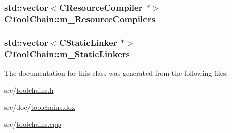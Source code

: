 \hypertarget{classCToolChain_a3e599d8c68f4a561cbbe8291ff1a3471}{
\subsubsection[{m\-\_\-\-Resource\-Compilers}]{\setlength{\rightskip}{0pt plus 5cm}std\-::vector$<${\bf C\-Resource\-Compiler} $\ast$$>$ C\-Tool\-Chain\-::m\-\_\-\-Resource\-Compilers\hspace{0.3cm}{\ttfamily [protected]}}}\label{classCToolChain_a3e599d8c68f4a561cbbe8291ff1a3471}
\hypertarget{classCToolChain_a1e20a20e78789bb05ee38b8da4ab6b3e}{
\subsubsection[{m\-\_\-\-Static\-Linkers}]{\setlength{\rightskip}{0pt plus 5cm}std\-::vector$<${\bf C\-Static\-Linker} $\ast$$>$ C\-Tool\-Chain\-::m\-\_\-\-Static\-Linkers\hspace{0.3cm}{\ttfamily [protected]}}}\label{classCToolChain_a1e20a20e78789bb05ee38b8da4ab6b3e}


The documentation for this class was generated from the following files\-:\begin{DoxyCompactItemize}
\item 
src/\hyperlink{toolchains_8h}{toolchains.\-h}\item 
src/doc/\hyperlink{toolchains_8dox}{toolchains.\-dox}\item 
src/\hyperlink{toolchains_8cpp}{toolchains.\-cpp}\end{DoxyCompactItemize}
